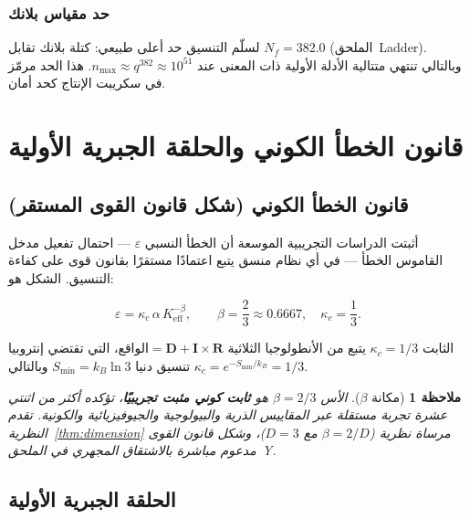 \documentclass[11pt,a4paper]{article}
\newtheorem{remark}{ملاحظة}
\begin{document}
	\subsubsection{حد مقياس بلانك}
	
	لسلّم التنسيق حد أعلى طبيعي: كتلة بلانك تقابل \(N_f = 382.0\) (الملحق~Ladder). وبالتالي تنتهي متتالية الأدلة الأولية ذات المعنى عند \(n_{\max} \approx q^{382} \approx 10^{51}\). هذا الحد مرمّز في سكريبت الإنتاج كحد أمان.
	
	\section{قانون الخطأ الكوني والحلقة الجبرية الأولية}
	\label{sec:error-law}
	
	\subsection{قانون الخطأ الكوني (شكل قانون القوى المستقر)}
	
	أثبتت الدراسات التجريبية الموسعة \cite{AppendixL, AppendixFerra} أن الخطأ النسبي \(\varepsilon\) — احتمال تفعيل مدخل القاموس الخطأ — في أي نظام منسق يتبع اعتمادًا مستقرًا بقانون قوى على كفاءة التنسيق. الشكل هو:
	
	\begin{equation}
		\boxed{\varepsilon = \kappa_c \, \alpha \, K_{\mathrm{eff}}^{-\beta}, \qquad
			\beta = \frac{2}{3} \approx 0.6667,\quad \kappa_c = \frac{1}{3}}.
		\label{eq:error-law-corrected}
	\end{equation}
	
	الثابت \(\kappa_c = 1/3\) يتبع من الأنطولوجيا الثلاثية \(\text{الواقع} = \mathbf{D} + \mathbf{I} \times \mathbf{R}\)، التي تقتضي إنتروبيا تنسيق دنيا \(S_{\min} = k_B \ln 3\) وبالتالي \(\kappa_c = e^{-S_{\min}/k_B} = 1/3\).
	
	\begin{remark}[مكانة \(\beta\)]
		الأس \(\beta = 2/3\) هو \textbf{ثابت كوني مثبت تجريبيًا}، تؤكده أكثر من اثنتي عشرة تجربة مستقلة عبر المقاييس الذرية والبيولوجية والجيوفيزيائية والكونية. تقدم النظرية~\ref{thm:dimension} مرساة نظرية (\(\beta = 2/D\) مع \(D=3\))، وشكل قانون القوى مدعوم مباشرة بالاشتقاق المجهري في الملحق~Y.
	\end{remark}
	
	\subsection{الحلقة الجبرية الأولية}
	\label{sec:algebraic-loop}
	
\end{document}
